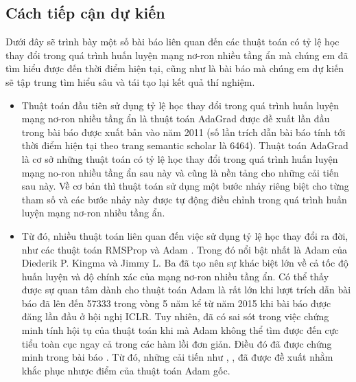 \documentclass{article}[14pt]
\begin{document}
{    \subsection{Cách tiếp cận dự kiến}
    
    
    
    Dưới đây sẽ trình bày một số bài báo liên quan đến các thuật toán có tỷ lệ học thay đổi trong quá trình huấn luyện mạng nơ-ron nhiều tầng ẩn mà chúng em đã tìm hiểu được đến thời điểm hiện tại, cũng như là bài báo mà chúng em dự kiến sẽ tập trung tìm hiểu sâu và tái tạo lại kết quả thí nghiệm.
    \begin{itemize}
        \item Thuật toán đầu tiên sử dụng tỷ lệ học thay đổi trong quá trình huấn luyện mạng nơ-ron nhiều tầng ẩn là thuật toán AdaGrad được đề xuất lần đầu trong bài báo \cite{Duchi2011AdaptiveSM} được xuất bản vào năm 2011 (số lần trích dẫn bài báo tính tới thời điểm hiện tại theo trang semantic scholar là 6464). Thuật toán AdaGrad là cơ sở những thuật toán có tỷ lệ học thay đổi trong quá trình huấn luyện mạng no-ron nhiều tầng ẩn sau này và cũng là nền tảng cho những cải tiến sau này. Về cơ bản thì thuật toán sử dụng một bước nhảy riêng biệt cho từng tham số và các bước nhảy này được tự động điều chỉnh trong quá trình huấn luyện mạng nơ-ron nhiều tầng ẩn.
        \item Từ đó, nhiều thuật toán liên quan đến việc sử dụng tỷ lệ học thay đổi ra đời, như các thuật toán RMSProp \cite{Tieleman2012RMSProp} và Adam \cite{Kingma2015AdamAM}. Trong đó nổi bật nhất là Adam của Diederik P. Kingma và Jimmy L. Ba đã tạo nên sự khác biệt lớn về cả tốc độ huấn luyện và độ chính xác của mạng nơ-ron nhiều tầng ẩn. Có thể thấy được sự quan tâm dành cho thuật toán Adam là rất lớn khi lượt trích dẫn bài báo đã lên đến 57333 trong vòng 5 năm kể từ năm 2015 khi bài báo được đăng lần đầu ở hội nghị ICLR. Tuy nhiên, đã có sai sót trong việc chứng minh tính hội tụ của thuật toán khi mà Adam không thể tìm được đến cực tiểu toàn cục ngay cả trong các hàm lồi đơn giản. Điều đó đã được chứng minh trong bài báo \cite{Reddi2018OnTC}. Từ đó, những cải tiến như \cite{Reddi2018OnTC}, \cite{Dozat2016IncorporatingNM}, \cite{Zhang2017NormalizedDA} đã được đề xuất nhằm khắc phục nhược điểm của thuật toán Adam gốc.

\end{itemize}}
\end{document}
